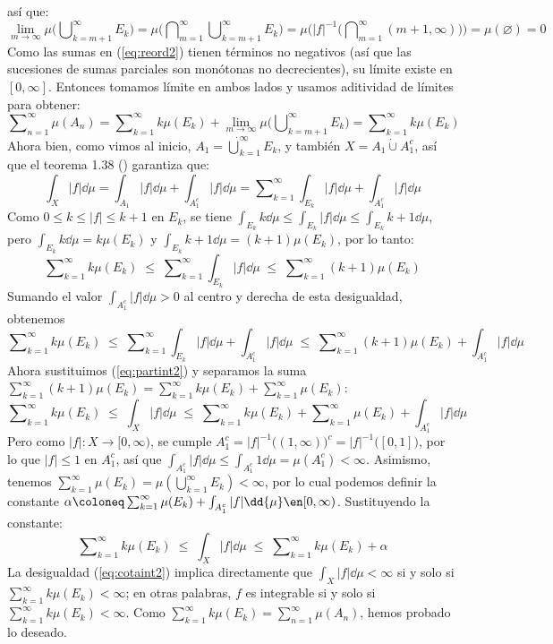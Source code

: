 \begin{sol}
{}
así que:%
\[
\lim_{m\to\infty}\mu\Big(\bigcup\nolimits^\infty_{k=m+1} E_k\Big)%
= \mu\Big( \bigcap\nolimits^\infty_{m=1}\bigcup\nolimits^\infty_{k=m+1} E_k \Big)%
= \mu\Big( |f|^{-1}\Big( \bigcap\nolimits^\infty_{m=1}(m+1,\infty) \Big) \Big)%
= \mu(\varnothing) = 0
\]
Como las sumas en (\ref{eq:reord2}) tienen términos no negativos (así que las sucesiones de sumas parciales son monótonas no decrecientes), su límite existe en $[0,\infty]$. Entonces tomamos límite en ambos lados y usamos aditividad de límites para obtener:
\[
\sum\nolimits^\infty_{n=1}\mu(A_n)%
= \sum\nolimits^\infty_{k=1}k\mu(E_k) + \lim_{m\to\infty}\mu\Big(\bigcup\nolimits^\infty_{k=m+1} E_k\Big)%
= \sum\nolimits^\infty_{k=1}k\mu(E_k)
\]
Ahora bien, como vimos al inicio, $A_1 = \dot\bigcup^\infty_{k=1}E_k$, y también $X = A_1 \mathbin{\dot{\cup}} A^c_1$, así que el teorema 1.38 (\cite{Salamon}) garantiza que:
\begin{equation}\label{eq:partint2}
\int_X|f|\dd{\mu}%
= \int_{A_1}|f|\dd{\mu} + \int_{A^c_1}|f|\dd{\mu}%
= \sum\nolimits^\infty_{k=1}\int_{E_k}|f|\dd{\mu} + \int_{A^c_1}|f|\dd{\mu}
\end{equation}
Como $0\leq k \leq |f| \leq k+1$ en $E_k$, se tiene $\int_{E_k}k\dd{\mu} \leq \int_{E_k}|f|\dd{\mu} \leq \int_{E_k}k+1\dd{\mu}$, pero $\int_{E_k}k\dd{\mu} = k\mu(E_k)$ y $\int_{E_k}k+1\dd{\mu} = (k+1)\mu(E_k)$, por lo tanto:
\[
\sum\nolimits^\infty_{k=1}k\mu(E_k) %
\;\leq\;%
\sum\nolimits^\infty_{k=1}\int_{E_k}|f|\dd{\mu}%
\;\leq\;%
\sum\nolimits^\infty_{k=1}(k+1)\mu(E_k)
\]
Sumando el valor $\int_{A^c_1}|f|\dd{\mu} > 0$ al centro y derecha de esta desigualdad, obtenemos
\[
\sum\nolimits^\infty_{k=1}k\mu(E_k) %
\;\leq\;%
\sum\nolimits^\infty_{k=1}\int_{E_k}|f|\dd{\mu} + \int_{A^c_1}|f|\dd{\mu}%
\;\leq\;%
\sum\nolimits^\infty_{k=1}(k+1)\mu(E_k) + \int_{A^c_1}|f|\dd{\mu}
\]
Ahora sustituimos (\ref{eq:partint2}) y separamos la suma $\sum\nolimits^\infty_{k=1}(k+1)\mu(E_k) = \sum\nolimits^\infty_{k=1}k\mu(E_k) + \sum\nolimits^\infty_{k=1}\mu(E_k)$:
\[
\sum\nolimits^\infty_{k=1}k\mu(E_k) %
\;\leq\;%
\int_{X}|f|\dd{\mu}%
\;\leq\;%
\sum\nolimits^\infty_{k=1}k\mu(E_k) + \sum\nolimits^\infty_{k=1}\mu(E_k) + \int_{A^c_1}|f|\dd{\mu}
\]
Pero como $|f| \colon X \to [0,\infty)$, se cumple $A^c_1 = |f|^{-1}\big((1,\infty)\big)^c = |f|^{-1}\big([0,1]\big)$, por lo que $|f| \leq 1$ en $A^c_1$, así que $\int_{A^c_1}|f|\dd{\mu} \leq \int_{A^c_1}1\dd{\mu} = \mu(A^c_1) < \infty$. Asimismo, tenemos $\sum\nolimits^\infty_{k=1}\mu(E_k) = \mu(\bigcup^\infty_{k=1}E_k) < \infty$, por lo cual podemos definir la constante $\alpha \coloneq \sum\nolimits^\infty_{k=1}\mu(E_k) + \int_{A^c_1}|f|\dd{\mu} \en [0,\infty)$. Sustituyendo la constante:
\begin{equation}\label{eq:cotaint2}
\sum\nolimits^\infty_{k=1}k\mu(E_k) %
\;\leq\;%
\int_{X}|f|\dd{\mu}%
\;\leq\;%
\sum\nolimits^\infty_{k=1}k\mu(E_k) + \alpha
\end{equation}
La desigualdad (\ref{eq:cotaint2}) implica directamente que $\int_{X}|f|\dd{\mu} < \infty$ si y solo si $\sum^\infty_{k=1}k\mu(E_k) < \infty$; en otras palabras, $f$ es integrable si y solo si $\sum^\infty_{k=1}k\mu(E_k) < \infty$. Como $\sum^\infty_{k=1}k\mu(E_k) = \sum^\infty_{n=1}\mu(A_n)$, hemos probado lo deseado.
\end{sol}